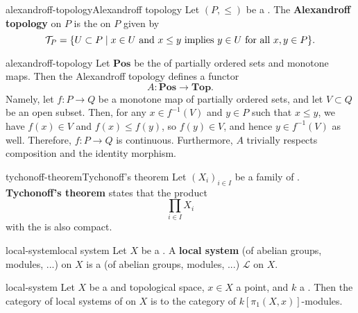 \begin{topic}{alexandroff-topology}{Alexandroff topology}
    Let $(P, \le)$ be a . The \textbf{Alexandroff topology} on $P$ is the  on $P$ given by
    \[ \mathcal{T}_P = \{ U \subset P \mid x \in U \textup{ and } x \le y \textup{ implies } y \in U \textup{ for all } x, y \in P \} . \]
\end{topic}

\begin{example}{alexandroff-topology}
    Let $\textbf{Pos}$ be the  of partially ordered sets and monotone maps. Then the Alexandroff topology defines a functor
    \[ A \colon \textbf{Pos} \to \textbf{Top} . \]
    Namely, let $f \colon P \to Q$ be a monotone map of partially ordered sets, and let $V \subset Q$ be an open subset. Then, for any $x \in f^{-1}(V)$ and $y \in P$ such that $x \le y$, we have $f(x) \in V$ and $f(x) \le f(y)$, so $f(y) \in V$, and hence $y \in f^{-1}(V)$ as well. Therefore, $f \colon P \to Q$ is continuous. Furthermore, $A$ trivially respects composition and the identity morphism.
\end{example}

\begin{topic}{tychonoff-theorem}{Tychonoff's theorem}
    Let $(X_i)_{i \in I}$ be a family of  . \textbf{Tychonoff's theorem} states that the product
    \[ \prod_{i \in I} X_i \]
    with the  is also compact.
\end{topic}

\begin{topic}{local-system}{local system}
    Let $X$ be a . A \textbf{local system} (of abelian groups, modules, ...) on $X$ is a  (of abelian groups, modules, ...) $\mathcal{L}$ on $X$.
\end{topic}

\begin{example}{local-system}
    Let $X$ be a  and  topological space, $x \in X$ a point, and $k$ a . Then the category of local systems of  on $X$ is  to the category of $k[\pi_1(X, x)]$-modules.
\end{example}

